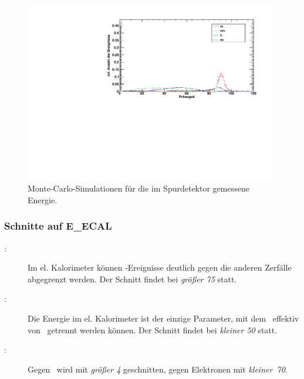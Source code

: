\begin{figure}[H]
\begin{center}
  \includegraphics[width=\textwidth]{../img/dist_Pcharged.pdf}
 \caption{Monte-Carlo-Simulationen für die im Spurdetektor gemessene Energie.}
  \label{img:dist_Pcharged}
\end{center}
\end{figure} 

\subsubsection*{Schnitte auf E\_ECAL}
\begin{description}
\item[\Zee:] Im el. Kalorimeter können \ee-Ereignisse deutlich
gegen die anderen Zerfälle abgegrenzt werden.
Der Schnitt findet bei \emph{größer 75} statt.
\item[\Zmm:] Die Energie im el. Kalorimeter ist der einzige Parameter, mit dem \mm\ effektiv
von \ee\ getrennt werden können.
Der Schnitt findet bei \emph{kleiner 50} statt.
\item[\Ztt:] Gegen \mm\ wird mit \emph{größer 4} geschnitten, gegen Elektronen mit \emph{kleiner~70}.
\end{description}

